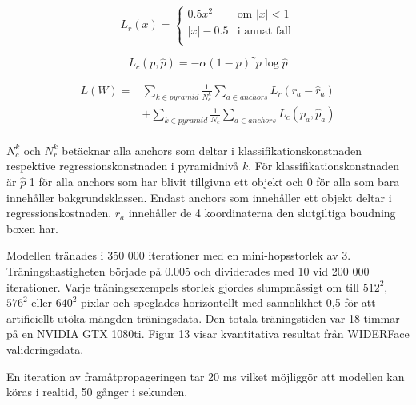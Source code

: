 \documentclass[a4paper,11pt,twoside]{article}
\begin{document}
\begin{equation}
L_r(x) = \begin{cases}
				0.5x^2 & \mbox{om } |x| < 1\\
				|x| - 0.5 & \mbox{i annat fall}\\
			\end{cases}
\end{equation}

\begin{equation}
L_c(p, \hat{p}) = - \alpha (1-p)^{\gamma}p \log{\hat{p}}
\end{equation}

\begin{equation}
\begin{split}
	L(W) = & \sum_{k \in pyramid} \frac{1}{N^k_c} \sum_{a \in anchors} L_r(r_a - \hat{r}_a) \\ 
	& + \sum_{k \in pyramid} \frac{1}{N^r_c} \sum_{a \in anchors} L_c(p_a, \hat{p}_a)  \\ 
\end{split}
\end{equation}

$N^k_c $ och $N^k_r $ betäcknar alla anchors som deltar i klassifikationskonstnaden respektive regressionskonstnaden i pyramidnivå $k$. För klassifikationskonstnaden är $\hat{p}$ 1 för alla anchors som har blivit tillgivna ett objekt och 0 för alla som bara innehåller bakgrundsklassen. Endast anchors som innehåller ett objekt deltar i regressionskostnaden. $r_a$ innehåller de 4 koordinaterna den slutgiltiga boudning boxen har.

Modellen tränades i 350 000 iterationer med en mini-hopsstorlek av 3. Träningshastigheten började på 0.005 och dividerades med 10 vid 200 000 iterationer. Varje träningsexempels storlek gjordes slumpmässigt om till $512^2$, $576^2$ eller $640^2$ pixlar och speglades horizontellt med sannolikhet 0,5 för att artificiellt utöka mängden träningsdata. Den totala träningstiden var 18 timmar på en NVIDIA GTX 1080ti. Figur 13 visar kvantitativa resultat från WIDERFace valideringsdata.

En iteration av framåtpropageringen tar 20 ms vilket möjliggör att modellen kan köras i realtid, 50 gånger i sekunden.
\end{document}
